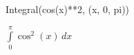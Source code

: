 \documentclass{article}
\begin{document}
Integral(cos(x)**2, (x, 0, pi))
 
\bigskip
$\int\limits_{0}^{\pi} \cos^{2}{\left(x \right)}\, dx$
 
\bigskip
\end{document}
